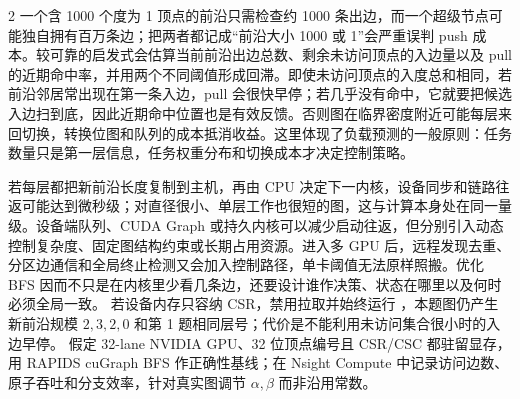 \begin{solutionexercise}{2}
一个含 1000 个度为 1 顶点的前沿只需检查约 1000 条出边，而一个超级节点可能独自拥有百万条边；把两者都记成“前沿大小 1000 或 1”会严重误判 push 成本。较可靠的启发式会估算当前前沿出边总数、剩余未访问顶点的入边量以及 pull 的近期命中率，并用两个不同阈值形成回滞。即使未访问顶点的入度总和相同，若前沿邻居常出现在第一条入边，pull 会很快早停；若几乎没有命中，它就要把候选入边扫到底，因此近期命中位置也是有效反馈。否则图在临界密度附近可能每层来回切换，转换位图和队列的成本抵消收益。这里体现了负载预测的一般原则：任务数量只是第一层信息，任务权重分布和切换成本才决定控制策略。

若每层都把新前沿长度复制到主机，再由 CPU 决定下一内核，设备同步和链路往返可能达到微秒级；对直径很小、单层工作也很短的图，这与计算本身处在同一量级。设备端队列、CUDA Graph 或持久内核可以减少启动往返，但分别引入动态控制复杂度、固定图结构约束或长期占用资源。进入多 GPU 后，远程发现去重、分区边通信和全局终止检测又会加入控制路径，单卡阈值无法原样照搬。优化 BFS 因而不只是在内核里少看几条边，还要设计谁作决策、状态在哪里以及何时必须全局一致。
\variantheading 若设备内存只容纳 CSR，禁用拉取并始终运行 ，本题图仍产生新前沿规模 $2,3,2,0$ 和第 1 题相同层号；代价是不能利用未访问集合很小时的入边早停。
\practiceheading 假定 32-lane NVIDIA GPU、32 位顶点编号且 CSR/CSC 都驻留显存，用 RAPIDS cuGraph BFS 作正确性基线；在 Nsight Compute 中记录访问边数、原子吞吐和分支效率，针对真实图调节 $\alpha,\beta$ 而非沿用常数。
\end{solutionexercise}

